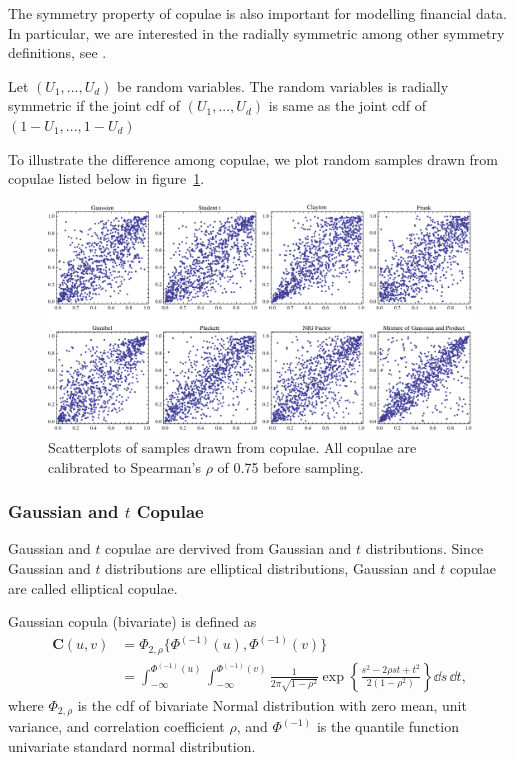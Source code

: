The symmetry property of copulae is also important for modelling financial data.
In particular, we are interested in the radially symmetric among other symmetry definitions, see \citet{Nelsen1999}.

\begin{defn}
    Let $(U_1, ..., U_d)$ be random variables.
    The random variables is radially symmetric if the joint cdf of $(U_1, ..., U_d)$ is same as the
    joint cdf of $(1-U_1, ..., 1-U_d)$

    \end{defn}

To illustrate the difference among copulae, we plot random samples drawn from copulae listed below in figure~\ref{fig:copulaeScatterPlot}.

\begin{figure}[t]
    \centering
  \includegraphics[width=\textwidth]{_pics/copulas_scatterplots.pdf}
  \caption{Scatterplots of samples drawn from copulae. All copulae are calibrated to Spearman's $\rho$ of 0.75 before sampling.}\label{fig:copulaeScatterPlot}
\end{figure}


\subsubsection{Gaussian and $t$ Copulae}\label{sec:ellpitical-copulae}

Gaussian and $t$ copulae are dervived from Gaussian and $t$ distributions.
Since Gaussian and $t$ distributions are elliptical distributions, Gaussian and $t$ copulae are called elliptical copulae. \medskip

Gaussian copula (bivariate) is defined as
\begin{align}
  \bm{C}(u,v) &= \Phi_{2, \rho}\{\Phi^{(-1)}(u), \Phi^{(-1)}(v)\} \nonumber \\
              &= \int_{-\infty}^{\Phi^{(-1)}(u)}
                \int_{-\infty}^{\Phi^{(-1)}(v)}
                \frac{1}{2\pi\sqrt{1-\rho^2}}
                \exp{\left\{
                \frac{s^2-2\rho st+t^2}{2(1-\rho^2)}
                \right\}} \dd s\, \dd t,
\end{align}
where $\Phi_{2, \rho}$ is the cdf of bivariate Normal distribution
with zero mean, unit variance, and correlation coefficient $\rho$, and
$\Phi^{(-1)}$ is the quantile function univariate standard normal
distribution. \medskip

